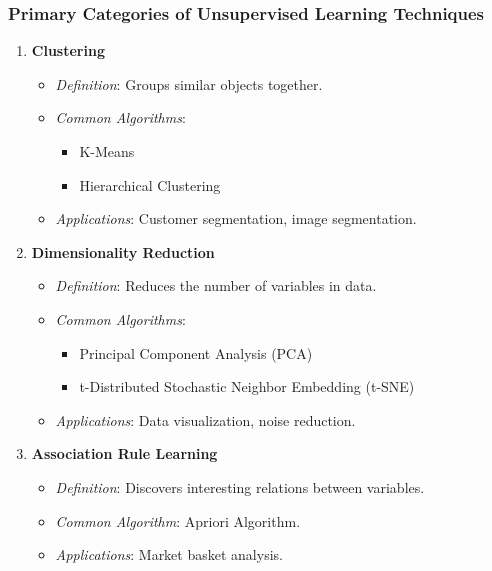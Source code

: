 \documentclass[aspectratio=169]{beamer}
\begin{document}
\begin{frame}[fragile]
    \frametitle{Primary Categories of Unsupervised Learning Techniques}
    \begin{enumerate}
        \item \textbf{Clustering}
            \begin{itemize}
                \item \textit{Definition}: Groups similar objects together.
                \item \textit{Common Algorithms}:
                    \begin{itemize}
                        \item K-Means
                        \item Hierarchical Clustering
                    \end{itemize}
                \item \textit{Applications}: Customer segmentation, image segmentation.
            \end{itemize}
        
        \item \textbf{Dimensionality Reduction}
            \begin{itemize}
                \item \textit{Definition}: Reduces the number of variables in data.
                \item \textit{Common Algorithms}:
                    \begin{itemize}
                        \item Principal Component Analysis (PCA)
                        \item t-Distributed Stochastic Neighbor Embedding (t-SNE)
                    \end{itemize}
                \item \textit{Applications}: Data visualization, noise reduction.
            \end{itemize}
        
        \item \textbf{Association Rule Learning}
            \begin{itemize}
                \item \textit{Definition}: Discovers interesting relations between variables.
                \item \textit{Common Algorithm}: Apriori Algorithm.
                \item \textit{Applications}: Market basket analysis.
            \end{itemize}
    \end{enumerate}
\end{frame}
\end{document}
